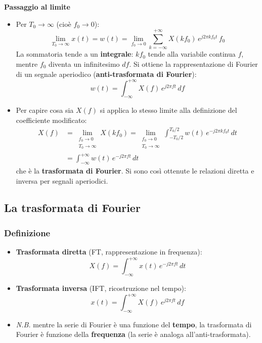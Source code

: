 \documentclass[12pt, a4paper]{article}
\begin{document}
\textbf{Passaggio al limite}
\begin{itemize}
    \item Per $T_0\to\infty$ (cioè $f_0\to0$):
    $$\lim_{T_0\to\infty}x(t)=w(t)=\lim_{f_0\to0}\sum_{k=-\infty}^{+\infty}X(kf_0)\,e^{j2\pi kf_0t}\,f_0$$
    La sommatoria tende a un \textbf{integrale}: $kf_0$ tende alla variabile continua $f$, mentre $f_0$ diventa un infinitesimo $df$. Si ottiene la rappresentazione di Fourier di un segnale aperiodico (\textbf{anti-trasformata di Fourier}):
    $$w(t)=\int_{-\infty}^{+\infty}X(f)\,e^{j2\pi ft}\,df$$
    \item Per capire cosa sia $X(f)$ si applica lo stesso limite alla definizione del coefficiente modificato:
    \begin{align*}
        X(f)&=\lim_{\substack{f_0\to0\\T_0\to\infty}}X(kf_0)=\lim_{\substack{f_0\to0\\T_0\to\infty}}\int_{-T_0/2}^{T_0/2}w(t)\,e^{-j2\pi kf_0t}\,dt\\
        &=\int_{-\infty}^{+\infty}w(t)\,e^{-j2\pi ft}\,dt
    \end{align*}
    che è la \textbf{trasformata di Fourier}. Si sono così ottenute le relazioni diretta e inversa per segnali aperiodici.
\end{itemize}

\subsection{La trasformata di Fourier}

\subsubsection{Definizione}
\begin{itemize}
    \item \textcolor{orange!80!black}{\textbf{Trasformata diretta}} (FT, rappresentazione in frequenza):
    $$X(f)=\int_{-\infty}^{+\infty}x(t)\,e^{-j2\pi ft}\,dt$$
    \item \textcolor{orange!80!black}{\textbf{Trasformata inversa}} (IFT, ricostruzione nel tempo):
    $$x(t)=\int_{-\infty}^{+\infty}X(f)\,e^{j2\pi ft}\,df$$
    \item \textit{N.B.} mentre la serie di Fourier è una funzione del \textbf{tempo}, la trasformata di Fourier è funzione della \textbf{frequenza} (la serie è analoga all'anti-trasformata).
\end{itemize}
\end{document}
